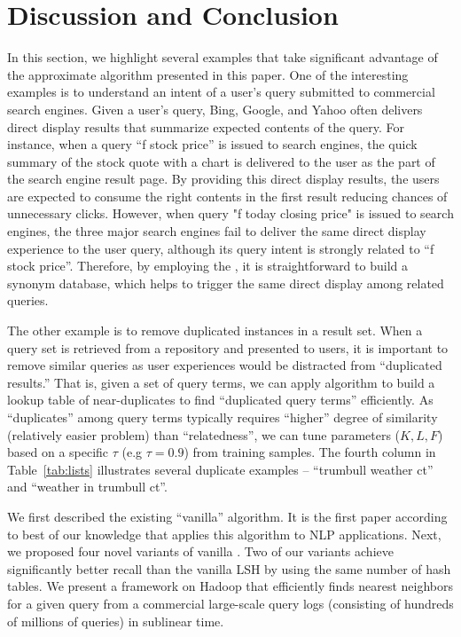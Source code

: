 \section{Discussion and Conclusion}
\label{sec:discuss}
In this section, we highlight several examples that take significant advantage of  the approximate \dflipb algorithm presented in this paper.
One of the interesting examples is to understand an intent of a user's query submitted to commercial search engines. Given a user's query,
Bing, Google, and Yahoo often delivers direct display results that summarize expected contents of the query. 
For instance, when a query ``f stock price'' is issued  to search engines, the quick summary of the stock quote with a chart is delivered 
to the user as the part of the search engine result page. By providing this direct display results, the users are expected to consume the right contents
in the first result reducing chances of unnecessary clicks. However, when query "f today closing price" is issued to search engines, the three major search engines 
fail to deliver the same direct display experience to the user query, although its query intent is strongly related to ``f stock price''. 
Therefore, by employing the \dflipb, it is straightforward to build a synonym database, which helps to trigger the same direct display among related queries.

The other example is to remove duplicated instances in a result set. 
When a query set is retrieved from a repository and presented to users, it is important to remove similar queries as user experiences would be distracted from ``duplicated results.'' 
That is, given a set of query terms, we can apply  \dflipb algorithm to build a lookup table of near-duplicates 
to find ``duplicated query terms'' efficiently. As ``duplicates'' among query terms typically requires ``higher'' degree of similarity (relatively easier problem) than ``relatedness'', we can tune parameters ($K, L, F$) based on a specific $\tau$ (e.g $\tau=0.9$) from training samples.  The fourth column in Table~\ref{tab:lists} illustrates several duplicate examples -- ``trumbull weather ct'' and ``weather in trumbull ct''.

We first described the existing ``vanilla'' \lsh algorithm. It is the first paper according to 
best of our knowledge that applies this algorithm to NLP applications. 
Next, we proposed four novel variants of vanilla \lsh. Two of our variants achieve 
significantly better recall than the vanilla LSH by using the same number of hash tables. 
We present a framework on Hadoop that efficiently finds nearest neighbors for a given query from a commercial large-scale query logs (consisting of hundreds of millions of queries) in sublinear time.
